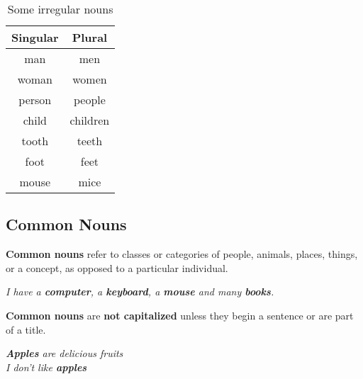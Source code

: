 \documentclass[hidelinks,10pt,a4paper]{article}
\begin{document}
\begin{table}[h]
\begin{center}
\begin{tabular}{|c|c|}
\hline
\textbf{Singular} & \textbf{Plural}\\
\hline
man & men\\ \hline
woman & women\\\hline
person & people\\\hline
child & children\\\hline
tooth & teeth\\\hline
foot & feet\\\hline
mouse & mice\\
\hline
\end{tabular}
\end{center}
\caption{\label{tab:nouns1}Some irregular nouns}
\end{table}


\subsection{Common Nouns}
\textbf{Common nouns} refer to classes or categories of people, animals, places, things, or a concept, as opposed to a particular individual.
\begin{center}
	\textit{I have a \textbf{computer}, a \textbf{keyboard}, a \textbf{mouse} and many \textbf{books}. }
\end{center}
\indent
\textbf{Common nouns} are \textbf{not capitalized} unless they begin a sentence or are part of a title.
\begin{center}
		\textit{
		\textbf{Apples} are delicious fruits\\
				I don't like \textbf{apples} }
\end{center}
\end{document}
